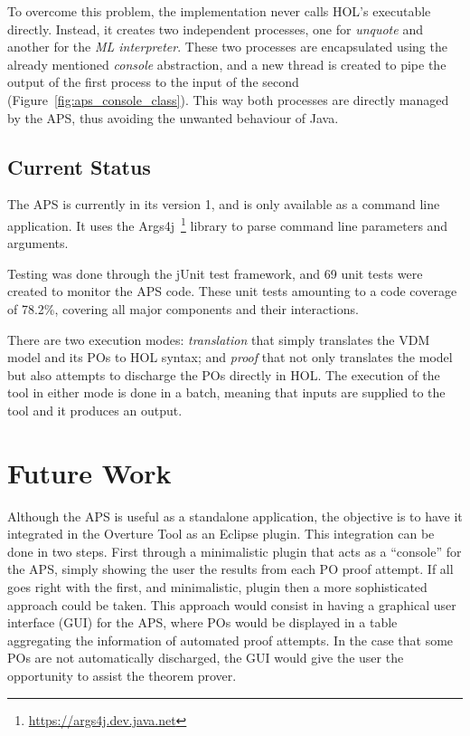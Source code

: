 \documentclass[]{article}
\begin{document}
To overcome this problem, the implementation never calls HOL's executable directly.
Instead, it creates two independent processes, one for \emph{unquote} and another for the \emph{ML interpreter}.
These two processes are encapsulated using the already mentioned \emph{console} abstraction, and a new thread is created to pipe the output of the first process to the input of the second (Figure~\ref{fig:aps_console_class}).
This way both processes are directly managed by the APS, thus avoiding the unwanted behaviour of Java.

\subsection{Current Status}

The APS is currently in its version 1, and is only available as a command line application.
It uses the Args4j~\footnote{\url{https://args4j.dev.java.net}} library to parse command line parameters and arguments.

Testing was done through the jUnit test framework, and 69 unit tests were created to monitor the APS code.
These unit tests amounting to a code coverage of 78.2\%, covering all major components and their interactions.

There are two execution modes: \emph{translation} that simply translates the VDM model and its POs to HOL syntax; and \emph{proof} that not only translates the model but also attempts to discharge the POs directly in HOL.
The execution of the tool in either mode is done in a batch, meaning that inputs are supplied to the tool and it produces an output.

\section{Future Work}
\label{sec:future_work}

Although the APS is useful as a standalone application, the objective is to have it integrated in the Overture Tool as an Eclipse plugin.
This integration can be done in two steps. 
First through a minimalistic plugin that acts as a ``console'' for the APS, simply showing the user the results from each PO proof attempt.
If all goes right with the first, and minimalistic, plugin then a more sophisticated approach could be taken.
This approach would consist in having a graphical user interface (GUI) for the APS, where POs would be displayed in a table aggregating the information of automated proof attempts.
In the case that some POs are not automatically discharged, the GUI would give the user the opportunity to assist the theorem prover.
\end{document}
